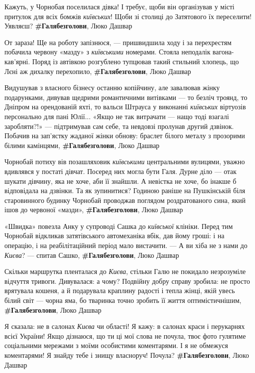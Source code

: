 Кажуть, у Чорнобая поселилася дівка! І требує, щоби він організував у місті
притулок для всіх бомжів \emph{київських}! Щоби зі столиці до Затятового їх
переселити! Уявляєш? \textbf{\#Галябезголови}, Люко Дашвар

От зараза! Ще на роботу запізнюся, — пришвидшила ходу і за перехрестям побачила
червону «мазду» з \emph{київськими} номерами. Стояла неподалік вагона-кав'ярні.
Поряд із автівкою розгублено тупцював такий стильний хлопець, що Лєні аж
дихалку перехопило, \textbf{\#Галябезголови}, Люко Дашвар

Видушував з власного бізнесу останню копійчину, але завалював жінку
подарунками, дивував щедрими романтичними витівками — то безліч троянд, то
Дніпром на орендованій яхті, то вальси Штрауса у виконанні \emph{київських} віртуозів
персонально для пані Юлії... «Якщо не так витрачати — нащо тоді взагалі
заробляти?!» — підтримував сам себе, та невдовзі пролунав другий дзвінок.
Побачив на зап'ястку жаданої жінки обнову: браслет білого металу з прозорими
білими камінцями, \textbf{\#Галябезголови}, Люко Дашвар

Чорнобай потиху вів позашляховик \emph{київськими} центральними вулицями, уважно
вдивлявся у постаті дівчат. Посеред них могла бути Галя. Дурне діло — отак
шукати дівчину, яка не хоче, аби її знайшли. А невістка не хоче, бо інакше б
відповідала на дзвінки. Та як зупинитися? Годиною раніше на Пушкінській біля
старовинного будинку Чорнобай проводжав поглядом роздратованого сина, який ішов
до червоної «мазди», \textbf{\#Галябезголови}, Люко Дашвар

«Швидка» повезла Анку у супроводі Сашка до \emph{київської} клініки. Перед тим
Чорнобай відкликав затятівського автомеханіка вбік, дав йому гроші: і на
операцію, і на реабілітаційний період мало вистачити.  — А ви хіба не з нами до
\emph{Києва}? — спитав Сашко, \textbf{\#Галябезголови}, Люко Дашвар

Скільки маршрутка пленталася до \emph{Києва}, стільки Галю не покидало
незрозуміле відчуття тривоги. Дивувалася: а чому? Подвійну добру справу
зробила: не просто врятувала кошеня, а й подарувала краплину радості і тепла
жінці, якій увесь білий світ — чорна яма, бо тваринка точно зробить її життя
оптимістичнішим, 
\textbf{\#Галябезголови}, Люко Дашвар

Я сказала: не в салонах \emph{Києва} чи області! Я кажу: в салонах краси і перукарнях
всієї України! Якщо дізнаюся, що ти ці мої слова не почула, твоє фото гулятиме
соціальними мережами з моїми особистими коментарями. І я не обмежуся
коментарями! Я знайду тебе і знищу власноруч! Почула?
\textbf{\#Галябезголови}, Люко Дашвар

